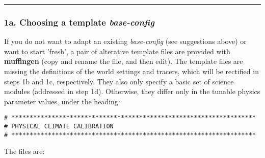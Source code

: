\documentclass[11pt,fleqn]{book} %
\begin{document}
%
\noindent\rule{4cm}{0.5pt}
\subsubsection{1a. Choosing a template \textit{base-config}}

If you do not want to adapt an existing \textit{base-config} (see suggestions above) or want to start 'fresh', a pair of alterative template files are provided with \textbf{muffingen} (copy and rename the file, and then edit). The template files are missing the definitions of the world settings and tracers, which will be rectified in steps 1b and 1c, respectively. They also only specify a basic set of science modules (addressed in step 1d). Otherwise, they differ only in the tunable physics parameter values, under the heading:

\footnotesize\vspace{-2pt}\begin{verbatim}
# *******************************************************************
# PHYSICAL CLIMATE CALIBRATION
# *******************************************************************
\end{verbatim}\vspace{-2pt}\normalsize
The files are:
\end{document}
